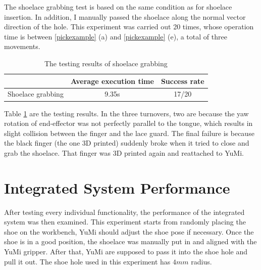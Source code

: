 The shoelace grabbing test is based on the same condition as for shoelace insertion. In addition, I manually passed the shoelace along the normal vector direction of the hole. This experiment was carried out 20 times, whose operation time is between \ref{pickexample} (a) and \ref{pickexample} (e), a total of three movements. 

\begin{table}[H]
\centering
\begin{tabular}{||c||c|c||}
\hline
 & Average execution time & Success rate \\ \hline \hline
Shoelace grabbing & 9.35s & 17/20 \\ \hline
\end{tabular}
\caption{The testing results of shoelace grabbing}
\label{pull}
\end{table}

Table \ref{pull} are the testing results. In the three turnovers, two are because the yaw rotation of end-effector was not perfectly parallel to the tongue, which results in slight collision between the finger and the lace guard. The final failure is because the black finger (the one 3D printed) suddenly broke when it tried to close and grab the shoelace. That finger was 3D printed again and reattached to YuMi.

\section{Integrated System Performance}
After testing every individual functionality, the performance of the integrated system was then examined. This experiment starts from randomly placing the shoe on the workbench, YuMi should adjust the shoe pose if necessary. Once the shoe is in a good position, the shoelace was manually put in and aligned with the YuMi gripper. After that, YuMi are supposed to pass it into the shoe hole and pull it out. The shoe hole used in this experiment has $4mm$ radius.

